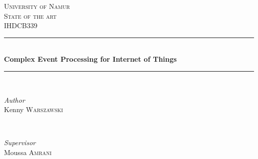 \documentclass[11pt]{article}
\begin{document}

\begin{titlepage} %
	\newcommand{\HRule}{\rule{\linewidth}{0.5mm}} %
	
	\center %
	
	
	\textsc{\LARGE University of Namur}\\[1.5cm] %
	
	\textsc{\Large State of the art}\\[0.5cm] %
	
	\textsc{\large IHDCB339}\\[0.5cm] %
	
	
	\HRule\\[0.4cm]
	
	{\huge\bfseries Complex Event Processing for Internet of Things}\\[0.4cm] %
	
	\HRule\\[1.5cm]
	
	
	\begin{minipage}{0.4\textwidth}
		\begin{flushleft}
			\large
			\textit{Author}\\
			Kenny \textsc{Warszawski} %
		\end{flushleft}
	\end{minipage}
	~
	\begin{minipage}{0.4\textwidth}
		\begin{flushright}
			\large
			\textit{Supervisor}\\
			Moussa \textsc{Amrani} %
		\end{flushright}
	\end{minipage}
	

\end{titlepage}
\end{document}
